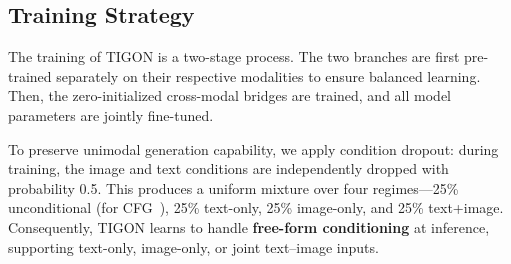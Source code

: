 


\subsection{Training Strategy}
The training of TIGON is a two-stage process. The two branches are first pre-trained separately on their respective modalities to ensure balanced learning. Then, the zero-initialized cross-modal bridges are trained, and all model parameters are jointly fine-tuned.


To preserve unimodal generation capability, we apply condition dropout: during training, the image and text conditions are independently dropped with probability 0.5. This produces a uniform mixture over four regimes—25\% unconditional (for CFG~\cite{cfg}), 25\% text-only, 25\% image-only, and 25\% text+image. Consequently, TIGON learns to handle \textbf{free-form conditioning} at inference, supporting text-only, image-only, or joint text–image inputs.